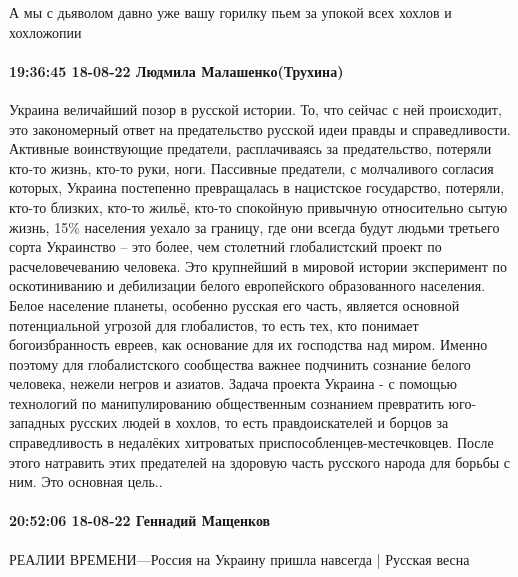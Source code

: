 А мы с дьяволом давно уже вашу горилку пьем за упокой всех хохлов и хохложопии

\paragraph{19:36:45 18-08-22 Людмила Малашенко(Трухина)}

Украина величайший позор в русской истории. То, что сейчас с ней происходит,
это закономерный ответ на предательство русской идеи правды и справедливости.
Активные воинствующие предатели, расплачиваясь за предательство, потеряли
кто-то жизнь, кто-то руки, ноги. Пассивные предатели, с молчаливого согласия
которых, Украина постепенно превращалась в нацистское государство, потеряли,
кто-то близких, кто-то жильё, кто-то спокойную привычную относительно сытую
жизнь, 15\% населения уехало за границу, где они всегда будут людьми третьего
сорта Украинство – это более, чем столетний глобалистский проект по
расчеловечеванию человека. Это крупнейший в мировой истории эксперимент по
оскотиниванию и дебилизации белого европейского образованного населения. Белое
население планеты, особенно русская его часть, является основной потенциальной
угрозой для глобалистов, то есть тех, кто понимает богоизбранность евреев, как
основание для их господства над миром. Именно поэтому для глобалистского
сообщества важнее подчинить сознание белого человека, нежели негров и азиатов.
Задача проекта Украина - с помощью технологий по манипулированию общественным
сознанием превратить юго-западных русских людей в хохлов, то есть
правдоискателей и борцов за справедливость в недалёких хитроватых
приспособленцев-местечковцев. После этого натравить этих предателей на здоровую
часть русского народа для борьбы с ним. Это основная цель..

\paragraph{20:52:06 18-08-22 Геннадий Мащенков}

РЕАЛИИ ВРЕМЕНИ---Россия на Украину пришла навсегда | Русская весна

